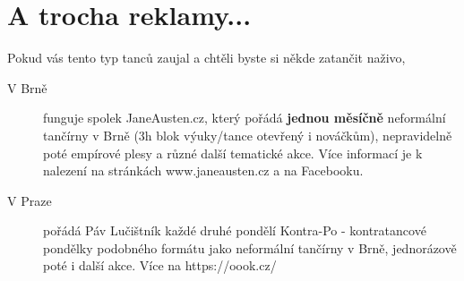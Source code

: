 \section*{A trocha reklamy...}

Pokud vás tento typ tanců zaujal a chtěli byste si někde zatančit naživo,
\begin{description}
    \item[V Brně] funguje spolek JaneAusten.cz, který pořádá \textbf{jednou měsíčně} neformální tančírny v Brně (3h blok výuky/tance otevřený i nováčkům), nepravidelně poté empírové plesy a různé další tematické akce. Více informací je k nalezení na stránkách www.janeausten.cz a na Facebooku.
    \item[V Praze] pořádá Páv Lučištník každé druhé pondělí Kontra-Po - kontratancové pondělky podobného formátu jako neformální tančírny v Brně, jednorázově poté i další akce. Více na https://oook.cz/
\end{description}

\cleardoublepage   %